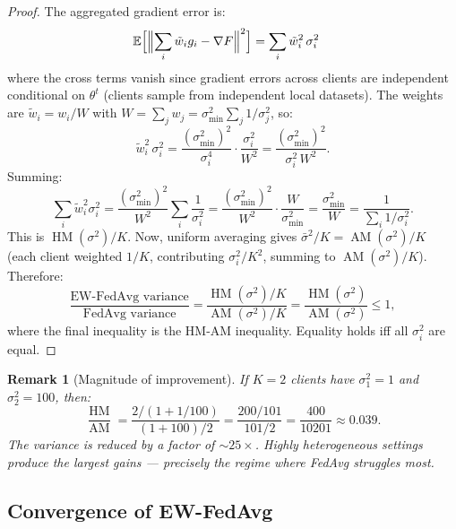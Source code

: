 \documentclass[11pt,a4paper]{article}
\newtheorem{remark}[theorem]{Remark}
\DeclareMathOperator{\AM}{AM}
\DeclareMathOperator{\HM}{HM}
\newcommand{\E}{\mathbb{E}}
\begin{document}
\begin{proof}
The aggregated gradient error is:
\begin{align}
  \E\Bigl[\Bigl\|\sum_i \tilde{w}_i g_i - \nabla F\Bigr\|^2\Bigr]
  &= \sum_i \tilde{w}_i^2 \,\sigma_i^2
  \label{eq:ew-step1}
\end{align}
where the cross terms vanish since gradient errors across clients are
independent conditional on $\theta^t$ (clients sample from independent
local datasets). The weights are $\tilde{w}_i = w_i / W$ with
$W = \sum_j w_j = \sigma_{\min}^2 \sum_j 1/\sigma_j^2$, so:
\begin{equation}
  \tilde{w}_i^2 \,\sigma_i^2
  = \frac{(\sigma_{\min}^2)^2}{\sigma_i^4} \cdot \frac{\sigma_i^2}{W^2}
  = \frac{(\sigma_{\min}^2)^2}{\sigma_i^2 \, W^2}.
\end{equation}
Summing:
\begin{equation}
  \sum_i \tilde{w}_i^2 \sigma_i^2
  = \frac{(\sigma_{\min}^2)^2}{W^2} \sum_i \frac{1}{\sigma_i^2}
  = \frac{(\sigma_{\min}^2)^2}{W^2} \cdot \frac{W}{\sigma_{\min}^2}
  = \frac{\sigma_{\min}^2}{W}
  = \frac{1}{\sum_i 1/\sigma_i^2}.
  \label{eq:ew-sum}
\end{equation}
This is $\HM(\sigma^2) / K$. Now, uniform averaging gives
$\bar{\sigma}^2 / K = \AM(\sigma^2) / K$ (each client weighted $1/K$,
contributing $\sigma_i^2 / K^2$, summing to $\AM(\sigma^2)/K$). Therefore:
\begin{equation}
  \frac{\text{EW-FedAvg variance}}{\text{FedAvg variance}}
  = \frac{\HM(\sigma^2) / K}{\AM(\sigma^2) / K}
  = \frac{\HM(\sigma^2)}{\AM(\sigma^2)} \leq 1,
\end{equation}
where the final inequality is the HM-AM inequality. Equality holds iff
all $\sigma_i^2$ are equal.
\end{proof}

\begin{remark}[Magnitude of improvement]
If $K = 2$ clients have $\sigma_1^2 = 1$ and $\sigma_2^2 = 100$, then:
\[
  \frac{\HM}{\AM} = \frac{2/(1 + 1/100)}{(1+100)/2}
  = \frac{200/101}{101/2} = \frac{400}{10201} \approx 0.039.
\]
The variance is reduced by a factor of $\sim\!25\times$. Highly heterogeneous
settings produce the largest gains --- precisely the regime where FedAvg
struggles most.
\end{remark}

\subsection{Convergence of EW-FedAvg}
\end{document}
